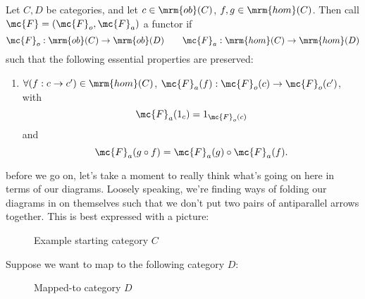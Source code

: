 \documentclass[nocover]{pset}
\newcommand{\ob}{\mrm{ob}}
\newcommand{\homm}{\mrm{hom}}
\begin{document}
\begin{definition}[Functor]
  Let $C, D$ be categories, and let $c \in \ob(C)$, $f,g \in
  \homm(C)$. Then call $\mc{F} = (\mc{F}_o, \mc{F}_a)$ a functor if
  \[
    \mc{F}_o : \ob(C) \to \ob(D) \qquad \mc{F}_a : \homm(C) \to
    \homm(D)
  \]
  such that the following essential properties are preserved:
  \begin{enumerate}
    \item $\forall (f : c \to c') \in \homm(C)$, $\mc{F}_a(f) :
      \mc{F}_o(c) \to \mc{F}_o(c')$, with
      \[
        \mc{F}_a(1_{c}) = 1_{\mc{F}_o(c)}
      \]
      and
      \[
        \mc{F}_a(g \circ f) = \mc{F}_a(g) \circ \mc{F}_a(f).
      \]
  \end{enumerate}
\end{definition}
before we go on, let's take a moment to really think what's going on
here in terms of our diagrams. Loosely speaking, we're finding ways of
folding our diagrams in on themselves such that we don't put two pairs
of antiparallel arrows together. This is best expressed with a
picture:
\begin{figure}[H]
  \centering
  \caption{Example starting category $C$}
\end{figure}
Suppose we want to map to the following category $D$:
\begin{figure}[H]
  \centering
  \caption{Mapped-to category $D$}
\end{figure}
\end{document}
